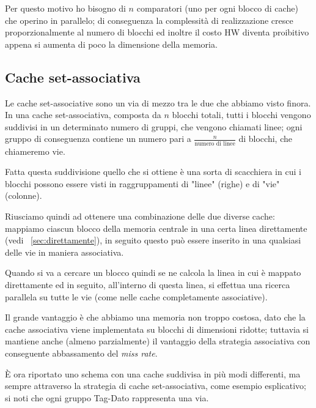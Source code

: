 \documentclass[class=book, crop=false, oneside]{standalone}
\begin{document}
Per questo motivo ho bisogno di $n$ comparatori (uno per ogni blocco di cache) che operino in parallelo; di conseguenza la complessità di realizzazione cresce proporzionalmente al numero di blocchi ed inoltre il costo HW diventa proibitivo appena si aumenta di poco la dimensione della memoria.

\subsection{Cache set-associativa}
Le cache set-associative sono un via di mezzo tra le due che abbiamo visto finora.
In una cache set-associativa, composta da $n$ blocchi totali, tutti i blocchi vengono suddivisi in un determinato numero di gruppi, che vengono chiamati linee; ogni gruppo di conseguenza contiene un numero pari a \(\frac{n}{\textrm{numero di linee}}\) di blocchi, che chiameremo vie.

Fatta questa suddivisione quello che si ottiene è una sorta di scacchiera in cui i blocchi possono essere visti in raggruppamenti di "linee" (righe) e di "vie" (colonne).

Riusciamo quindi ad ottenere una combinazione delle due diverse cache: mappiamo ciascun blocco della memoria centrale in una certa linea direttamente (vedi ~\ref{sec:direttamente}), in seguito questo può essere inserito in una qualsiasi delle vie in maniera associativa.


Quando si va a cercare un blocco quindi se ne calcola la linea in cui è mappato direttamente ed in seguito, all'interno di questa linea, si effettua una ricerca parallela su tutte le vie (come nelle cache completamente associative).

Il grande vantaggio è che abbiamo una memoria non troppo costosa, dato che la cache associativa viene implementata su blocchi di dimensioni ridotte; tuttavia si mantiene anche (almeno parzialmente) il vantaggio della strategia associativa con conseguente abbassamento del \emph{miss rate}.

È ora riportato uno schema con una cache suddivisa in più modi differenti, ma sempre attraverso la strategia di cache set-associativa, come esempio esplicativo; si noti che ogni gruppo Tag-Dato rappresenta una via.
\end{document}
